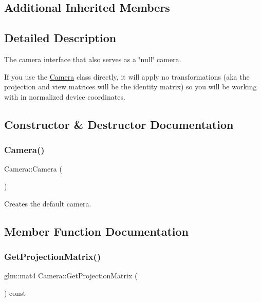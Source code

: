 \subsection*{Additional Inherited Members}


\subsection{Detailed Description}
The camera interface that also serves as a \char`\"{}null\char`\"{} camera. 

If you use the \hyperlink{class_camera}{Camera} class directly, it will apply no transformations (aka the projection and view matrices will be the identity matrix) so you will be working with in normalized device coordinates. 

\subsection{Constructor \& Destructor Documentation}
\hypertarget{class_camera_a01f94c3543f56ede7af49dc778f19331}{}\label{class_camera_a01f94c3543f56ede7af49dc778f19331} 
\subsubsection{\texorpdfstring{Camera()}{Camera()}}
{\footnotesize\ttfamily Camera\+::\+Camera (\begin{DoxyParamCaption}{ }\end{DoxyParamCaption})}



Creates the default camera. 



\subsection{Member Function Documentation}
\hypertarget{class_camera_af6f4415189deaff158ba86f0b3527a30}{}\label{class_camera_af6f4415189deaff158ba86f0b3527a30} 
\subsubsection{\texorpdfstring{Get\+Projection\+Matrix()}{GetProjectionMatrix()}}
{\footnotesize\ttfamily glm\+::mat4 Camera\+::\+Get\+Projection\+Matrix (\begin{DoxyParamCaption}{ }\end{DoxyParamCaption}) const\hspace{0.3cm}{\ttfamily [virtual]}}




